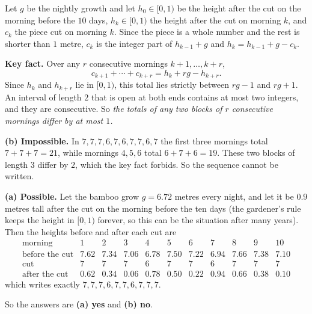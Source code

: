Let $g$ be the nightly growth and let $h_0\in[0,1)$ be the height after the cut on the morning before the $10$ days, $h_k\in[0,1)$ the height after the cut on morning $k$, and $c_k$ the piece cut on morning $k$. Since the piece is a whole number and the rest is shorter than $1$ metre, $c_k$ is the integer part of $h_{k-1}+g$ and $h_k=h_{k-1}+g-c_k$.

\textbf{Key fact.} Over any $r$ consecutive mornings $k+1,\dots,k+r$,
\[
c_{k+1}+\cdots+c_{k+r}=h_k+rg-h_{k+r}.
\]
Since $h_k$ and $h_{k+r}$ lie in $[0,1)$, this total lies strictly between $rg-1$ and $rg+1$. An interval of length $2$ that is open at both ends contains at most two integers, and they are consecutive. So \emph{the totals of any two blocks of $r$ consecutive mornings differ by at most $1$.}

\textbf{(b) Impossible.} In $7,7,7,6,7,6,7,7,6,7$ the first three mornings total $7+7+7=21$, while mornings $4,5,6$ total $6+7+6=19$. These two blocks of length $3$ differ by $2$, which the key fact forbids. So the sequence cannot be written.

\textbf{(a) Possible.} Let the bamboo grow $g=6.72$ metres every night, and let it be $0.9$ metres tall after the cut on the morning before the ten days (the gardener's rule keeps the height in $[0,1)$ forever, so this can be the situation after many years). Then the heights before and after each cut are
\[
\begin{array}{c|cccccccccc}
\text{morning}&1&2&3&4&5&6&7&8&9&10\\\hline
\text{before the cut}&7.62&7.34&7.06&6.78&7.50&7.22&6.94&7.66&7.38&7.10\\
\text{cut}&7&7&7&6&7&7&6&7&7&7\\
\text{after the cut}&0.62&0.34&0.06&0.78&0.50&0.22&0.94&0.66&0.38&0.10
\end{array}
\]
which writes exactly $7,7,7,6,7,7,6,7,7,7$.

So the answers are \textbf{(a) yes} and \textbf{(b) no}.
